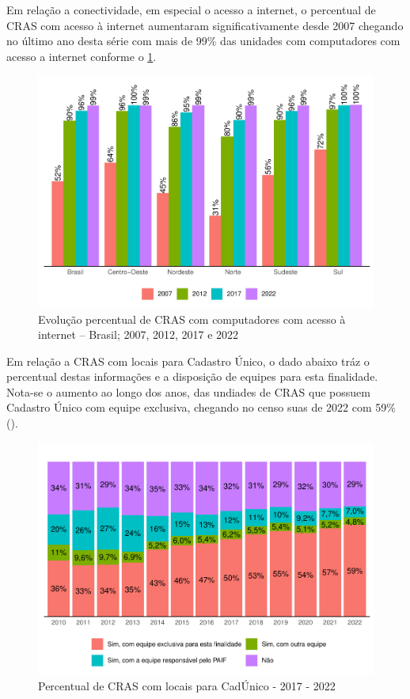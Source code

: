 \documentclass[
  brazilian]{report}
\begin{document}
Em relação a conectividade, em especial o acesso a internet, o
percentual de CRAS com acesso à internet aumentaram significativamente
desde 2007 chegando no último ano desta série com mais de 99\% das
unidades com computadores com acesso a internet conforme o
\cref{fig:CRAS-internet-percentual}.

\begin{figure}
\includegraphics{Censo-SUAS-2022_files/figure-latex/CRAS-internet-percentual-1} \caption[Evolução percentual de CRAS com computadores com acesso à internet – Brasil]{Evolução percentual de CRAS com computadores com acesso à internet – Brasil; 2007, 2012, 2017 e 2022}\label{fig:CRAS-internet-percentual}
\end{figure}

Em relação a CRAS com locais para Cadastro Único, o dado abaixo tráz o
percentual destas informações e a disposição de equipes para esta
finalidade. Nota-se o aumento ao longo dos anos, das undiades de CRAS
que possuem Cadastro Único com equipe exclusiva, chegando no censo suas
de 2022 com 59\% ().

\begin{figure}
\includegraphics{Censo-SUAS-2022_files/figure-latex/equip-cadunico-cras-1} \caption[Percentual de CRAS com locais para CadÚnico - 2017 - 2022]{Percentual de CRAS com locais para CadÚnico - 2017 - 2022}\label{fig:equip-cadunico-cras}
\end{figure}
\end{document}
